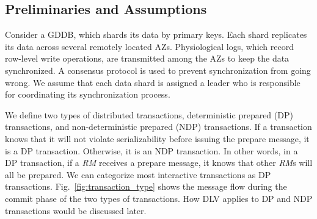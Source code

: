 \documentclass[conference]{IEEEtran}
\begin{document}
\subsection{Preliminaries and Assumptions}
Consider a GDDB, which shards its data by primary keys.
Each shard replicates its data across several remotely located AZs.
Physiological logs, which record row-level write operations, are transmitted among the AZs to keep the data synchronized.
A consensus protocol is used to prevent synchronization from going wrong.
We assume that each data shard is assigned a leader who is responsible for coordinating its synchronization process.
\begin{highlighted}
We define two types of distributed transactions,  deterministic prepared (DP) transactions, and non-deterministic prepared (NDP) transactions.
If a transaction knows that it will not violate serializability before issuing the prepare message, it is a DP transaction. Otherwise, it is an NDP transaction. 
In other words, in a DP transaction, if a \emph{RM} receives a prepare message, it knows that other \emph{RM}s will all be prepared.
We can categorize most interactive transactions as DP transactions.
Fig.~\ref{fig:transaction_type} shows the message flow during the commit phase of the two types of transactions.
How DLV applies to DP and NDP transactions would be discussed later.
\end{highlighted}

\end{document}
